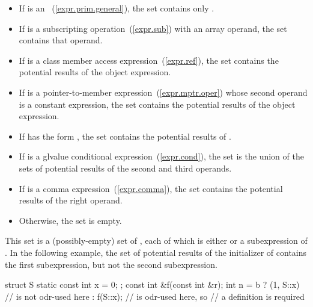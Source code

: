 \begin{itemize}
\item If  is an
~(\ref{expr.prim.general}), the set
contains only .
\item If  is a subscripting operation~(\ref{expr.sub}) with
an array operand, the set contains that operand.
\item If  is a class member access
expression~(\ref{expr.ref}), the set contains the potential results of
the object expression.
\item If  is a pointer-to-member
expression~(\ref{expr.mptr.oper}) whose second operand is a constant
expression, the set contains the potential results of the object
expression.
\item If  has the form , the set contains the
potential results of .
\item If  is a glvalue conditional
expression~(\ref{expr.cond}), the set is the union of the sets of
potential results of the second and third operands.
\item If  is a comma expression~(\ref{expr.comma}), the set
contains the potential results of the right operand.
\item Otherwise, the set is empty.
\end{itemize}
\enternote
This set is a (possibly-empty) set of ,
each of which is either  or a subexpression of .
\enterexample
In the following example, the set of potential results of the initializer
of  contains the first  subexpression, but not the second
 subexpression.
\begin{codeblock}
struct S { static const int x = 0; };
const int &f(const int &r);
int n = b ? (1, S::x)  //  is not odr-used here
          : f(S::x);   //  is odr-used here, so
                       // a definition is required
\end{codeblock}
\exitexample
\exitnote

